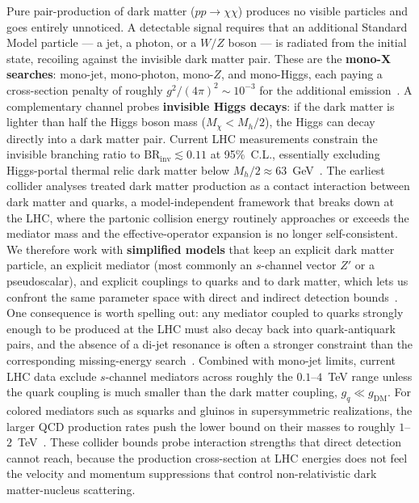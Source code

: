 Pure pair-production of dark matter ($pp \to \chi\chi$) produces no visible particles and goes entirely unnoticed.
A detectable signal requires that an additional Standard Model particle --- a jet, a photon, or a $W/Z$ boson --- is radiated from the initial state, recoiling against the invisible dark matter pair.
These are the \textbf{mono-X searches}: mono-jet, mono-photon, mono-$Z$, and mono-Higgs, each paying a cross-section penalty of roughly $g^2/(4\pi)^2 \sim 10^{-3}$ for the additional emission~\cite{Cirelli:2024ssz}.
A complementary channel probes \textbf{invisible Higgs decays}: if the dark matter is lighter than half the Higgs boson mass ($M_\chi < M_h/2$), the Higgs can decay directly into a dark matter pair.
Current LHC measurements constrain the invisible branching ratio to $\text{BR}_\text{inv} \lesssim 0.11$ at 95\%~C.L., essentially excluding Higgs-portal thermal relic dark matter below $M_h/2 \approx 63$~GeV~\cite{ATLAS:2023tkt,Cirelli:2024ssz}.
The earliest collider analyses treated dark matter production as a contact interaction between dark matter and quarks, a model-independent framework that breaks down at the LHC, where the partonic collision energy routinely approaches or exceeds the mediator mass and the effective-operator expansion is no longer self-consistent.
We therefore work with \textbf{simplified models} that keep an explicit dark matter particle, an explicit mediator (most commonly an $s$-channel vector $Z'$ or a pseudoscalar), and explicit couplings to quarks and to dark matter, which lets us confront the same parameter space with direct and indirect detection bounds~\cite{Boveia:2018yeb}.
One consequence is worth spelling out: any mediator coupled to quarks strongly enough to be produced at the LHC must also decay back into quark-antiquark pairs, and the absence of a di-jet resonance is often a stronger constraint than the corresponding missing-energy search~\cite{Boveia:2018yeb}.
Combined with mono-jet limits, current LHC data exclude $s$-channel mediators across roughly the $0.1$--$4$~TeV range unless the quark coupling is much smaller than the dark matter coupling, $g_q \ll g_\text{DM}$.
For colored mediators such as squarks and gluinos in supersymmetric realizations, the larger QCD production rates push the lower bound on their masses to roughly $1$--$2$~TeV~\cite{Cirelli:2024ssz,Hooper:2024}.
These collider bounds probe interaction strengths that direct detection cannot reach, because the production cross-section at LHC energies does not feel the velocity and momentum suppressions that control non-relativistic dark matter-nucleus scattering.

